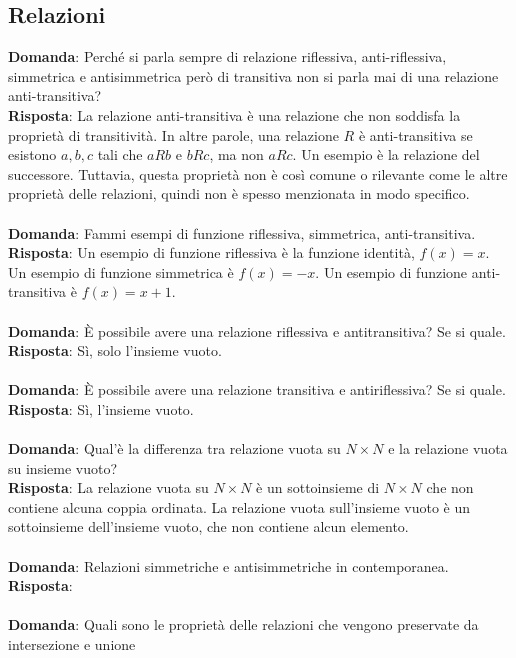 \documentclass{article}
\begin{document}
\subsection{Relazioni}
\textbf{Domanda}: Perché si parla sempre di relazione riflessiva, anti-riflessiva, simmetrica e antisimmetrica però di transitiva non si parla mai di una relazione anti-transitiva?\\
\textbf{Risposta}: La relazione anti-transitiva è una relazione che non soddisfa la proprietà di transitività. In altre parole, una relazione $R$ è anti-transitiva se esistono $a, b, c$ tali che $a R b$ e $b R c$, ma non $a R c$. Un esempio è la relazione del successore. Tuttavia, questa proprietà non è così comune o rilevante come le altre proprietà delle relazioni, quindi non è spesso menzionata in modo specifico. \\ \\
\textbf{Domanda}: Fammi esempi di funzione riflessiva, simmetrica, anti-transitiva. \\
\textbf{Risposta}: Un esempio di funzione riflessiva è la funzione identità, $f(x) = x$. Un esempio di funzione simmetrica è $f(x) = -x$. Un esempio di funzione anti-transitiva è $f(x) = x + 1$. \\ \\
\textbf{Domanda}:  \`E possibile avere una relazione riflessiva e antitransitiva? Se si quale. \\
\textbf{Risposta}: Sì, solo l'insieme vuoto. \\ \\
\textbf{Domanda}:  \`E possibile avere una relazione transitiva e antiriflessiva? Se si quale. \\
\textbf{Risposta}: Sì, l'insieme vuoto. \\ \\
\textbf{Domanda}: Qual'è la differenza tra relazione vuota su $N \times N$ e la relazione vuota su insieme vuoto? \\
\textbf{Risposta}: La relazione vuota su $N \times N$ è un sottoinsieme di $N \times N$ che non contiene alcuna coppia ordinata. La relazione vuota sull'insieme vuoto è un sottoinsieme dell'insieme vuoto, che non contiene alcun elemento. \\ \\
\textbf{Domanda}: Relazioni simmetriche e antisimmetriche in contemporanea. \\
\textbf{Risposta}: \\ \\
\textbf{Domanda}: Quali sono le proprietà delle relazioni che vengono preservate da intersezione e unione
\end{document}
